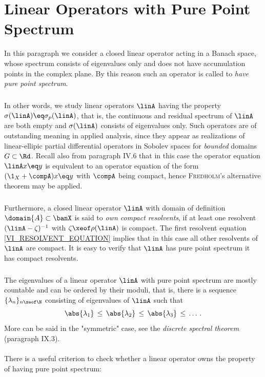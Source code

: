 \documentclass[11pt,twoside]{article}
\def\G{G}
\begin{document}
\section{Linear Operators with Pure Point Spectrum}
In this paragraph
we consider a closed linear operator acting in a Banach space,
whose spectrum consists of eigenvalues only
and does not have accumulation points in the complex plane.
By this reason such an operator is called to \textit{have pure point spectrum}.

\subparagraph{}
In other words,
we study linear operators $\linA$ having the property
$\sigma(\linA) \eq \sigma_p(\linA)$,
that is,
the continuous and residual spectrum of $\linA$ are both empty
and $\sigma(\linA)$ consists of eigenvalues only.
Such operators are of outstanding meaning in applied analysis,
since they appear as
realizations of linear-ellipic partial differential operators
in Sobolev spaces for \textit{bounded} domains $\G \subset \Rd$.
Recall also from paragraph IV.6
that in this case
the operator equation $\linA x \eq y$ is equivalent to an operator
equation of the form $(\1_X + \compA) x \eq y$ with $\compA$ being compact,
hence \textsc{Fredholm}'s alternative theorem may be applied. 

\subparagraph{} %
Furthermore,
a closed linear operator $\linA$
with domain of definition $\domain{A} \subset \banX$
is said to \textit{own compact resolvents},
if at least one resolvent $(\linA -\zeta)^{-1}$ with $\zeta \xeof \rho(\linA)$
is compact.
The first resolvent equation \eqref{VI_RESOLVENT_EQUATION} implies
that in this case all other resolvents of $\linA$ are compact.
It is easy to verify
that $\linA$ has pure point spectrum
\iff it has compact resolvents.

\subparagraph{} %
The eigenvalues of a linear operator $\linA$ with pure point spectrum
are mostly countable and can be ordered by their moduli,
that is,
there is a sequence $\{ \lambda_n \}_{n \xeof \N}$ consisting
of eigenvalues of $\linA$
such that
\[
\abs{\lambda_1} \,\leq\, \abs{\lambda_2} \,\leq\, \abs{\lambda_3} \,\leq\,
\ldots \, .
\]
More can be said in the "symmetric" case,
see the \textit{discrete spectral theorem} (paragraph IX.3).

\paragraph{} %
There is a useful criterion to check
whether a linear operator owns the property of having pure point spectrum:
\end{document}
